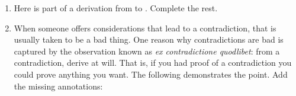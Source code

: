 \begin{enumerate}
\begin{argumentN}[1]


\end{argumentN}

\newpage
\item Here is part of a derivation from  to     
 . Complete the rest.

\begin{argumentN}[1]






\opts{

 \dotline
 \dotline
 \dotline
 \dotline
 \dotline
 \dotline
 \dotline
}
{
 }


\end{argumentN}

 \item When someone offers considerations that lead to a contradiction, that is 
  usually taken to be a bad thing. One reason why contradictions are bad is 
  captured by the observation known as \emph{ex contradictione quodlibet}: from 
  a contradiction, derive at will. That is, if you had proof of a contradiction 
  you could prove anything you want. The following demonstrates the point. Add 
  the missing annotations:


\begin{argumentN}[1]





\end{argumentN}
\end{enumerate}
